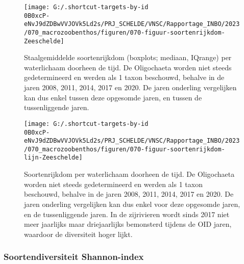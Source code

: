 \documentclass[twoside]{extreport}
\begin{document}
\begin{figure}[H]

{\centering \texttt{[image: G:/.shortcut-targets-by-id\\0B0xcP-eNvJ9dZDBwVVJOVk5Ld2s/PRJ\_SCHELDE/VNSC/Rapportage\_INBO/2023/070\_macrozoobenthos/figuren/070-figuur-soortenrijkdom-Zeeschelde]} 

}

\caption{Staalgemiddelde soortenrijkdom (boxplots; mediaan, IQrange) per waterlichaam doorheen de tijd. De Oligochaeta worden niet steeds gedetermineerd en werden als 1 taxon beschouwd, behalve in de jaren 2008, 2011, 2014, 2017 en 2020. De jaren onderling vergelijken kan dus enkel tussen deze opgesomde jaren, en tussen de tussenliggende jaren.}\label{fig:070-figuur15}
\end{figure}
\begin{figure}[H]

{\centering \texttt{[image: G:/.shortcut-targets-by-id\\0B0xcP-eNvJ9dZDBwVVJOVk5Ld2s/PRJ\_SCHELDE/VNSC/Rapportage\_INBO/2023/070\_macrozoobenthos/figuren/070-figuur-soortenrijkdom-lijn-Zeeschelde]} 

}

\caption{Soortenrijkdom per waterlichaam doorheen de tijd. De Oligochaeta worden niet steeds gedetermineerd en werden als 1 taxon beschouwd, behalve in de jaren 2008, 2011, 2014, 2017 en 2020. De jaren onderling vergelijken kan dus enkel voor deze opgesomde jaren, en de tussenliggende jaren. In de zijrivieren wordt sinds 2017 niet meer jaarlijks maar driejaarlijks bemonsterd tijdens de OID jaren, waardoor de diversiteit hoger lijkt.}\label{fig:070-figuur15b}
\end{figure}

\hypertarget{soortendiversiteit-shannon-index}{%
\subsubsection{Soortendiversiteit
Shannon-index}\label{soortendiversiteit-shannon-index}}
\end{document}
